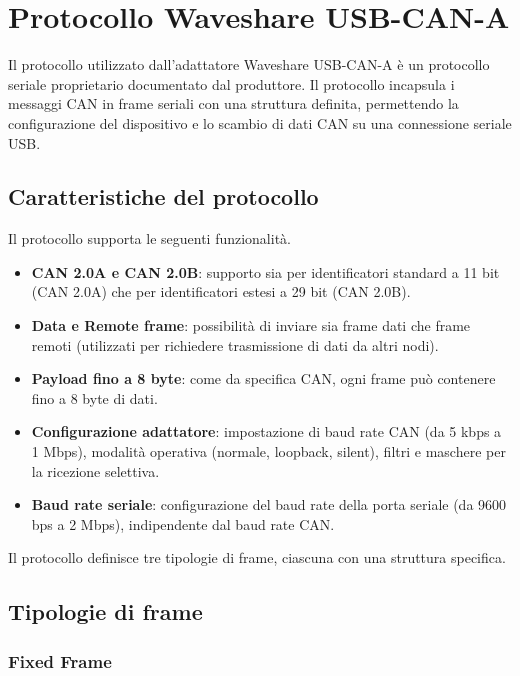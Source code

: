 \section{Protocollo Waveshare USB-CAN-A}
\label{sec:protocollo_waveshare}

Il protocollo utilizzato dall'adattatore Waveshare USB-CAN-A è un protocollo seriale proprietario documentato dal produttore. Il protocollo incapsula i messaggi CAN in frame seriali con una struttura definita, permettendo la configurazione del dispositivo e lo scambio di dati CAN su una connessione seriale USB.

\subsection{Caratteristiche del protocollo}

Il protocollo supporta le seguenti funzionalità.
\begin{itemize}
    \item \textbf{CAN 2.0A e CAN 2.0B}: supporto sia per identificatori standard a 11 bit (CAN 2.0A) che per identificatori estesi a 29 bit (CAN 2.0B).
    \item \textbf{Data e Remote frame}: possibilità di inviare sia frame dati che frame remoti (utilizzati per richiedere trasmissione di dati da altri nodi).
    \item \textbf{Payload fino a 8 byte}: come da specifica CAN, ogni frame può contenere fino a 8 byte di dati.
    \item \textbf{Configurazione adattatore}: impostazione di baud rate CAN (da 5 kbps a 1 Mbps), modalità operativa (normale, loopback, silent), filtri e maschere per la ricezione selettiva.
    \item \textbf{Baud rate seriale}: configurazione del baud rate della porta seriale (da 9600 bps a 2 Mbps), indipendente dal baud rate CAN.
\end{itemize}

Il protocollo definisce tre tipologie di frame, ciascuna con una struttura specifica.

\subsection{Tipologie di frame}

\subsubsection{Fixed Frame}

